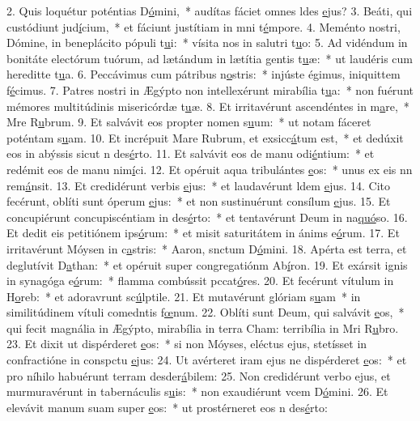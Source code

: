 2. Quis loquétur poténtias D\uline{ó}mini,~* audítas fáciet omnes ldes \uline{e}jus?
3. Beáti, qui custódiunt jud\uline{í}cium,~* et fáciunt justítiam in mni t\uline{é}mpore.
4. Meménto nostri, Dómine, in beneplácito pópuli t\uline{u}i:~* vísita nos in salutri t\uline{u}o:
5. Ad vidéndum in bonitáte electórum tuórum, ad lætándum in lætítia gentis t\uline{u}æ:~* ut laudéris cum hereditte t\uline{u}a.
6. Peccávimus cum pátribus n\uline{o}stris:~* injúste égimus, iniquittem f\uline{é}cimus.
7. Patres nostri in Ægýpto non intellexérunt mirabília t\uline{u}a:~* non fuérunt mémores multitúdinis misericórdæ t\uline{u}æ.
8. Et irritavérunt ascendéntes in m\uline{a}re,~* Mre R\uline{u}brum.
9. Et salvávit eos propter nomen s\uline{u}um:~* ut notam fáceret poténtam s\uline{u}am.
10. Et incrépuit Mare Rubrum, et exsicc\uline{á}tum est,~* et dedúxit eos in abýssis sicut n des\uline{é}rto.
11. Et salvávit eos de manu odi\uline{é}ntium:~* et redémit eos de manu nim\uline{í}ci.
12. Et opéruit aqua tribulántes \uline{e}os:~* unus ex eis nn rem\uline{á}nsit.
13. Et credidérunt verbis \uline{e}jus:~* et laudavérunt ldem \uline{e}jus.
14. Cito fecérunt, oblíti sunt óperum \uline{e}jus:~* et non sustinuérunt consílum \uline{e}jus.
15. Et concupiérunt concupiscéntiam in des\uline{é}rto:~* et tentavérunt Deum in na\uline{quó}so.
16. Et dedit eis petitiónem ips\uline{ó}rum:~* et misit saturitátem in ánims e\uline{ó}rum.
17. Et irritavérunt Móysen in c\uline{a}stris:~* Aaron, snctum D\uline{ó}mini.
18. Apérta est terra, et deglutívit D\uline{a}than:~* et opéruit super congregatiónm Ab\uline{í}ron.
19. Et exársit ignis in synagóga e\uline{ó}rum:~* flamma combússit pccat\uline{ó}res.
20. Et fecérunt vítulum in H\uline{o}reb:~* et adoravrunt sc\uline{ú}lptile.
21. Et mutavérunt glóriam s\uline{u}am~* in similitúdinem vítuli comedntis f\uline{œ}num.
22. Oblíti sunt Deum, qui salvávit \uline{e}os,~* qui fecit magnália in Ægýpto, mirabília in terra Cham: terribília in Mri R\uline{u}bro.
23. Et dixit ut dispérderet \uline{e}os:~* si non Móyses, eléctus ejus, stetísset in confractióne in conspctu \uline{e}jus:
24. Ut avérteret iram ejus ne dispérderet \uline{e}os:~* et pro níhilo habuérunt terram desder\uline{á}bilem:
25. Non credidérunt verbo ejus, et murmuravérunt in tabernáculis s\uline{u}is:~* non exaudiérunt vcem D\uline{ó}mini.
26. Et elevávit manum suam super \uline{e}os:~* ut prostérneret eos n des\uline{é}rto:
